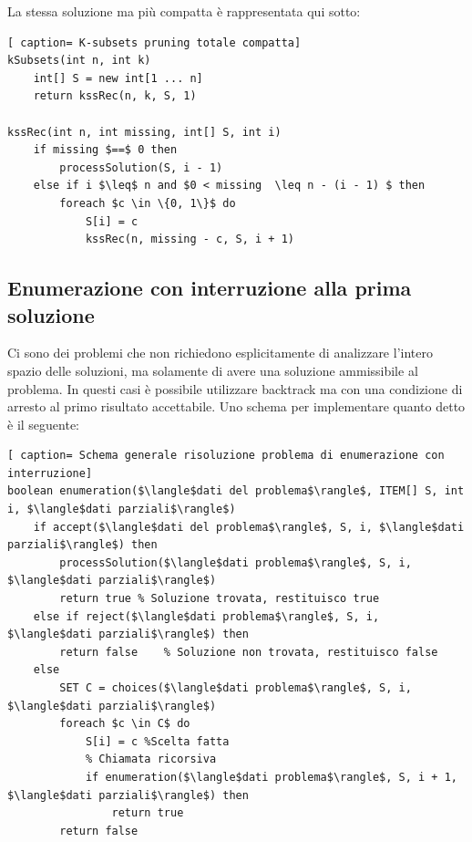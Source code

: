 \documentclass[../cheatSheetAlgoritmi.tex]{subfiles}
\begin{document}
La stessa soluzione ma più compatta è rappresentata qui sotto:
 \begin{lstlisting}[ caption= K-subsets pruning totale compatta]
kSubsets(int n, int k)
	int[] S = new int[1 ... n]
	return kssRec(n, k, S, 1)

kssRec(int n, int missing, int[] S, int i)
	if missing $==$ 0 then
		processSolution(S, i - 1)
	else if i $\leq$ n and $0 < missing  \leq n - (i - 1) $ then
		foreach $c \in \{0, 1\}$ do
			S[i] = c
			kssRec(n, missing - c, S, i + 1)
\end{lstlisting}
\subsection{Enumerazione con interruzione alla prima soluzione}
Ci sono dei problemi che non richiedono esplicitamente di analizzare l'intero spazio delle soluzioni, ma solamente di avere una soluzione ammissibile al problema. In questi casi è possibile utilizzare backtrack ma con una condizione di arresto al primo risultato accettabile. Uno schema per implementare quanto detto è il seguente:
 \begin{lstlisting}[ caption= Schema generale risoluzione problema di enumerazione con interruzione]
boolean enumeration($\langle$dati del problema$\rangle$, ITEM[] S, int i, $\langle$dati parziali$\rangle$)
	if accept($\langle$dati del problema$\rangle$, S, i, $\langle$dati parziali$\rangle$) then
		processSolution($\langle$dati problema$\rangle$, S, i, $\langle$dati parziali$\rangle$)
		return true	% Soluzione trovata, restituisco true
	else if reject($\langle$dati problema$\rangle$, S, i, $\langle$dati parziali$\rangle$) then	
		return false	% Soluzione non trovata, restituisco false
	else
		SET C = choices($\langle$dati problema$\rangle$, S, i, $\langle$dati parziali$\rangle$)
		foreach $c \in C$ do
			S[i] = c %Scelta fatta
			% Chiamata ricorsiva
			if enumeration($\langle$dati problema$\rangle$, S, i + 1, $\langle$dati parziali$\rangle$) then
				return true
		return false
\end{lstlisting}
\end{document}

